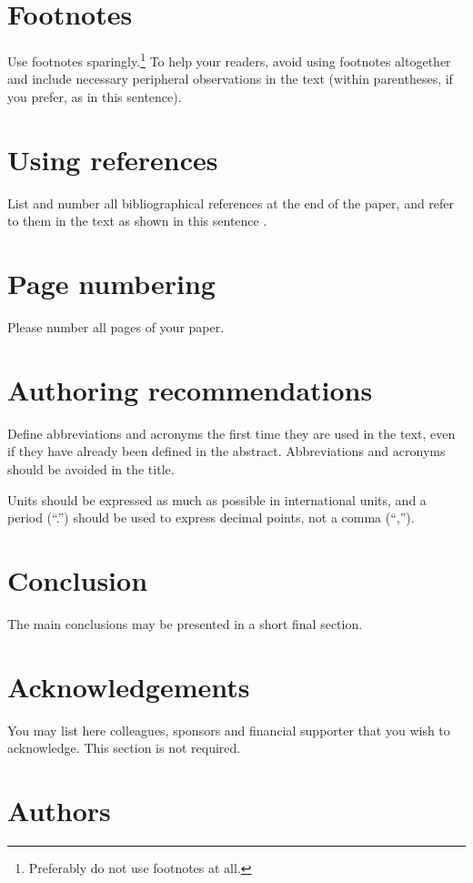 \documentclass[10pt,a4paper,twocolumn]{article}
\begin{document}
\section{Footnotes}
\label{sec:sec7}
Use footnotes sparingly.\footnote{Preferably do not use footnotes at all.}
To help your readers, avoid using footnotes altogether and include necessary peripheral observations in the text (within parentheses, if you prefer, as in this sentence).


\section{Using references}
\label{sec:sec8}
List and number all bibliographical references at the end of the paper, and refer to them in the text as shown in this sentence \cite{wiegand2019WHO}.


\section{Page numbering}
\label{sec:sec9}
Please number all pages of your paper.


\section{Authoring recommendations}
\label{sec:sec10}
Define abbreviations and acronyms the first time they are used in the text, even if they have already been defined in the abstract.
Abbreviations and acronyms should be avoided in the title.

Units should be expressed as much as possible in international units, and a period (``.'') should be used to express decimal points, not a comma (``,'').


\section{Conclusion}
\label{sec:sec11}
The main conclusions may be presented in a short final section.


\section*{Acknowledgements}
\label{sec:ackn}
You may list here colleagues, sponsors and financial supporter that you wish to acknowledge.
This section is not required.


\printbibliography


\section*{Authors}
\label{sec:auth}
\end{document}
